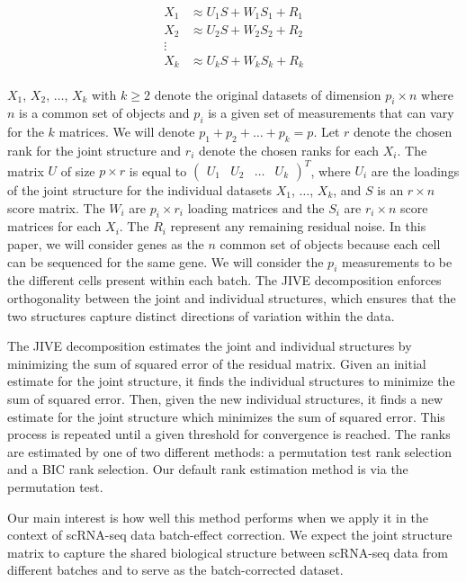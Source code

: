 \documentclass[
12pt, %
letterpaper, %
oneside, %
headinclude,footinclude, %
BCOR5mm, %
]{scrartcl}
\begin{document}
\begin{align}
    \begin{split}
    X_{1} &\approx U_{1} S + W_{1} S_{1} + R_{1} \\
    X_{2} &\approx U_{2} S + W_{2} S_{2} + R_{2} \\
    \vdots & \\
    X_{k} &\approx U_{k} S + W_{k} S_{k} + R_{k}
    \end{split}
\label{eq:jive_pca}
\end{align}

$X_1$, $X_2$, $\ldots$, $X_k$ with $k \ge 2$ denote the original datasets of dimension $p_i \times n$ where $n$ is a common set of objects and $p_i$ is a given set of measurements that can vary for the $k$ matrices. We will denote $p_1 + p_2 + \ldots + p_k = p$. Let $r$ denote the chosen rank for the joint structure and $r_i$ denote the chosen ranks for each $X_i$. The matrix $U$ of size $p \times r$ is equal to $ \begin{pmatrix} U_1 & U_2 & \hdots & U_k \end{pmatrix}^T $, where $U_i$ are the loadings of the joint structure for the individual datasets $X_1$, $\ldots$, $X_k$, and $S$ is an $r \times n$ score matrix. The $W_i$ are $p_i \times r_i$ loading matrices and the $S_i$ are $r_i \times n$ score matrices for each $X_i$. The $R_i$ represent any remaining residual noise. In this paper, we will consider genes as the $n$ common set of objects because each cell can be sequenced for the same gene. We will consider the $p_i$ measurements to be the different cells present within each batch. The JIVE decomposition enforces orthogonality between the joint and individual structures, which ensures that the two structures capture distinct directions of variation within the data.

The JIVE decomposition estimates the joint and individual structures by minimizing the sum of squared error of the residual matrix. Given an initial estimate for the joint structure, it finds the individual structures to minimize the sum of squared error. Then, given the new individual structures, it finds a new estimate for the joint structure which minimizes the sum of squared error. This process is repeated until a given threshold for convergence is reached. The ranks are estimated by one of two different methods: a permutation test rank selection and a BIC rank selection. Our default rank estimation method is via the permutation test.

Our main interest is how well this method performs when we apply it in the context of scRNA-seq data batch-effect correction. We expect the joint structure matrix to capture the shared biological structure between scRNA-seq data from different batches and to serve as the batch-corrected dataset.
\end{document}
